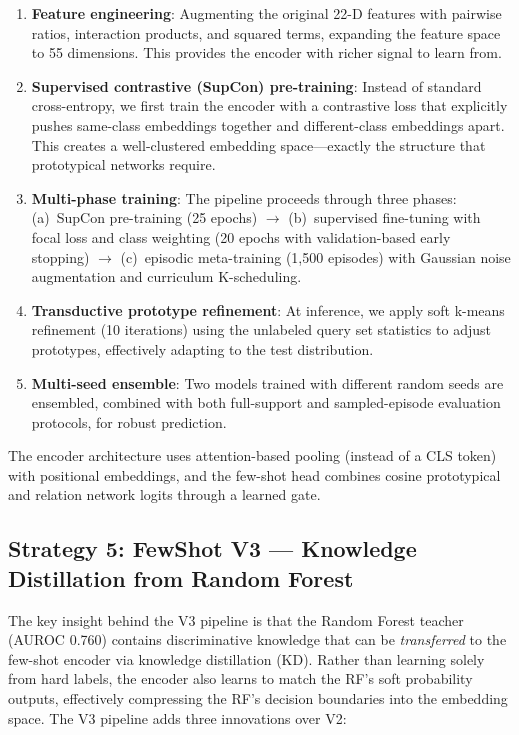 \begin{enumerate}
\item \textbf{Feature engineering}: Augmenting the original 22-D features with pairwise ratios, interaction products, and squared terms, expanding the feature space to 55 dimensions. This provides the encoder with richer signal to learn from.
\item \textbf{Supervised contrastive (SupCon) pre-training}: Instead of standard cross-entropy, we first train the encoder with a contrastive loss that explicitly pushes same-class embeddings together and different-class embeddings apart. This creates a well-clustered embedding space---exactly the structure that prototypical networks require.
\item \textbf{Multi-phase training}: The pipeline proceeds through three phases: (a)~SupCon pre-training (25 epochs) $\to$ (b)~supervised fine-tuning with focal loss and class weighting (20 epochs with validation-based early stopping) $\to$ (c)~episodic meta-training (1,500 episodes) with Gaussian noise augmentation and curriculum K-scheduling.
\item \textbf{Transductive prototype refinement}: At inference, we apply soft k-means refinement (10 iterations) using the unlabeled query set statistics to adjust prototypes, effectively adapting to the test distribution.
\item \textbf{Multi-seed ensemble}: Two models trained with different random seeds are ensembled, combined with both full-support and sampled-episode evaluation protocols, for robust prediction.
\end{enumerate}

The encoder architecture uses attention-based pooling (instead of a CLS token) with positional embeddings, and the few-shot head combines cosine prototypical and relation network logits through a learned gate.

\subsection{Strategy 5: FewShot V3 --- Knowledge Distillation from Random Forest}

The key insight behind the V3 pipeline is that the Random Forest teacher (AUROC 0.760) contains discriminative knowledge that can be \emph{transferred} to the few-shot encoder via knowledge distillation (KD). Rather than learning solely from hard labels, the encoder also learns to match the RF's soft probability outputs, effectively compressing the RF's decision boundaries into the embedding space. The V3 pipeline adds three innovations over V2:

